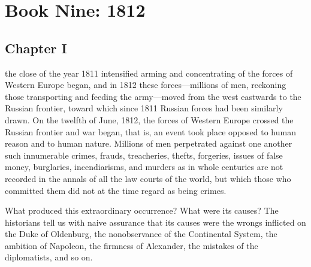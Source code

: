 \part*{Book Nine: 1812}


\chapter*{Chapter I}
\ifaudio
{} 
\fi

 the close of the year 1811 intensified arming and
concentrating of the forces of Western Europe began, and in 1812
these forces---millions of men, reckoning those transporting and
feeding the army---moved from the west eastwards to the Russian
frontier, toward which since 1811 Russian forces had been
similarly drawn. On the twelfth of June, 1812, the forces of
Western Europe crossed the Russian frontier and war began, that
is, an event took place opposed to human reason and to human
nature. Millions of men perpetrated against one another such
innumerable crimes, frauds, treacheries, thefts, forgeries,
issues of false money, burglaries, incendiarisms, and murders as
in whole centuries are not recorded in the annals of all the law
courts of the world, but which those who committed them did not
at the time regard as being crimes.

What produced this extraordinary occurrence? What were its
causes? The historians tell us with naive assurance that its
causes were the wrongs inflicted on the Duke of Oldenburg, the
nonobservance of the Continental System, the ambition of
Napoleon, the firmness of Alexander, the mistakes of the
diplomatists, and so on.

